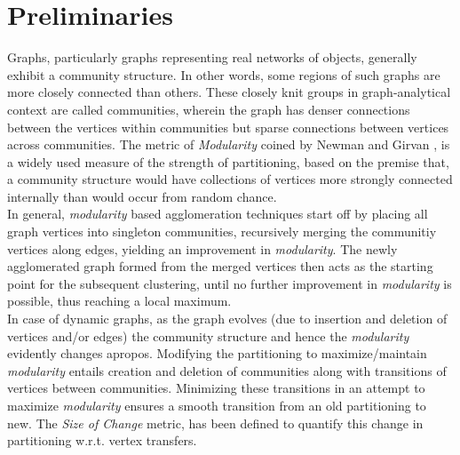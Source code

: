 \documentclass[conference]{IEEEtran}
\begin{document}
\section{Preliminaries}
Graphs, particularly graphs representing real networks of objects, generally
exhibit a community structure. In other words, some regions of such graphs are
more closely connected than others. These closely knit groups in
graph-analytical context are called communities, wherein the graph has 
denser connections between the vertices within communities but sparse 
connections between vertices across communities. The metric of 
\emph{Modularity} coined by Newman and Girvan \cite{new}, is a widely used 
measure of the strength of partitioning, based on the premise that, a community 
structure would have collections of vertices more strongly connected internally 
than would occur from random chance.\\
In general, \emph{modularity} based agglomeration techniques start off by 
placing all graph vertices into singleton communities, recursively merging 
the communitiy vertices along edges, yielding an improvement in 
\emph{modularity}. 
The newly agglomerated graph formed from the merged vertices then acts as the 
starting point for the subsequent clustering, until no further improvement in 
\emph{modularity} is possible, thus reaching a local maximum.\\
In case of dynamic graphs, as the graph evolves (due to insertion and deletion 
of vertices and/or edges) the community structure and hence the 
\emph{modularity} evidently changes apropos. Modifying the partitioning to 
maximize/maintain \emph{modularity} entails creation and deletion of communities 
along with transitions of vertices between communities. Minimizing these 
transitions in an attempt to maximize \emph{modularity} ensures a smooth 
transition from an old partitioning to new. The \emph{Size of Change} metric, 
has been defined to quantify this change in partitioning w.r.t. vertex 
transfers.
\end{document}
